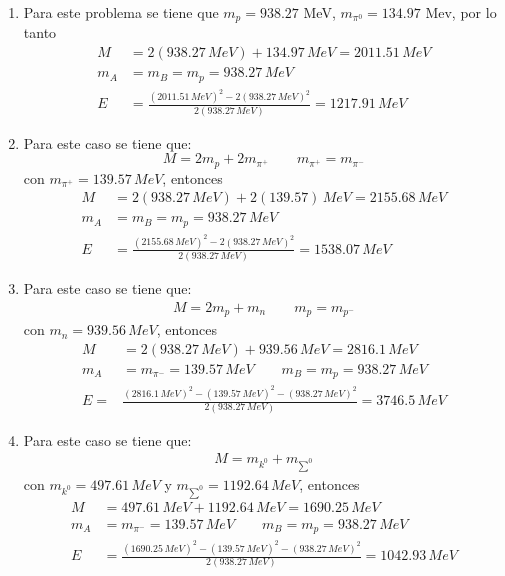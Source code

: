 \begin{enumerate}
    \item Para este problema se tiene que  $m_p=938.27$ MeV, $m_{\pi^0} = 134.97$ Mev, por lo tanto
    \begin{align*}
        M&=2(938.27\,MeV)+134.97\,MeV=2011.51\,MeV\\
        m_A&=m_B=m_p=938.27\,MeV\\
        E&=\frac{(2011.51\,MeV)^2-2(938.27\,MeV)^2}{2(938.27\,MeV)}=1217.91\,MeV
    \end{align*}
    \item Para este caso se tiene que: 
    \begin{equation*}
        M=2m_p+2m_{\pi^+} \qquad m_{\pi^+}=m_{\pi^-}
    \end{equation*}
    con $m_{\pi^+}=139.57\,MeV$, entonces
    \begin{align*}
        M&=2(938.27\,MeV)+2(139.57)\,MeV=2155.68\,MeV\\
        m_A&=m_B=m_p=938.27\,MeV\\
        E&=\frac{(2155.68\,MeV)^2-2(938.27\,MeV)^2}{2(938.27\,MeV)}=1538.07\,MeV
    \end{align*}
    \item Para este caso se tiene que:
    \begin{align*}
        M=2m_p+m_n \qquad m_p=m_{p^-}
    \end{align*}
        con $m_n=939.56\,MeV$, entonces
    \begin{align*}
        M&=2(938.27\,MeV)+939.56\,MeV=2816.1\,MeV\\
        m_A&=m_{\pi^-}=139.57\,MeV \qquad m_B=m_p=938.27\,MeV\\
        E=&\frac{(2816.1\,MeV)^2-(139.57\,MeV)^2-(938.27\,MeV)^2}{2(938.27\,MeV)}=3746.5\,MeV
    \end{align*}
    \item Para este caso se tiene que:
    \begin{align*}
        M=m_{k^0}+m_{\sum^0}
    \end{align*}
    con $m_{k^0}=497.61\,MeV$ y $m_{\sum^0}=1192.64\,MeV$, entonces
    \begin{align*}
        M&=497.61\,MeV+1192.64\,MeV=1690.25\,MeV\\
        m_A&=m_{\pi^-}=139.57\,MeV \qquad m_B=m_p=938.27\,MeV\\
        E&=\frac{(1690.25\,MeV)^2-(139.57\,MeV)^2-(938.27\,MeV)^2}{2(938.27\,MeV)}=1042.93\,MeV
    \end{align*}
\end{enumerate}